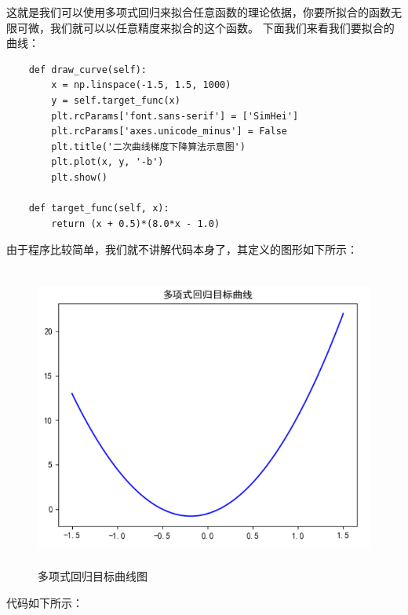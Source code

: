 \documentclass[UTF8]{article}
\begin{document}
这就是我们可以使用多项式回归来拟合任意函数的理论依据，你要所拟合的函数无限可微，我们就可以以任意精度来拟合的这个函数。\newline
下面我们来看我们要拟合的曲线：
\begin{lstlisting}
    def draw_curve(self):
        x = np.linspace(-1.5, 1.5, 1000)
        y = self.target_func(x)
        plt.rcParams['font.sans-serif'] = ['SimHei']
        plt.rcParams['axes.unicode_minus'] = False
        plt.title('二次曲线梯度下降算法示意图')
        plt.plot(x, y, '-b')
        plt.show()

    def target_func(self, x):
        return (x + 0.5)*(8.0*x - 1.0)
\end{lstlisting}
由于程序比较简单，我们就不讲解代码本身了，其定义的图形如下所示：
\begin{figure}[H]
	\caption{多项式回归目标曲线图}
	\label{f000016}
	\centering
	\includegraphics[height=10cm]{images/f000016}
\end{figure}
代码如下所示：
\end{document}
